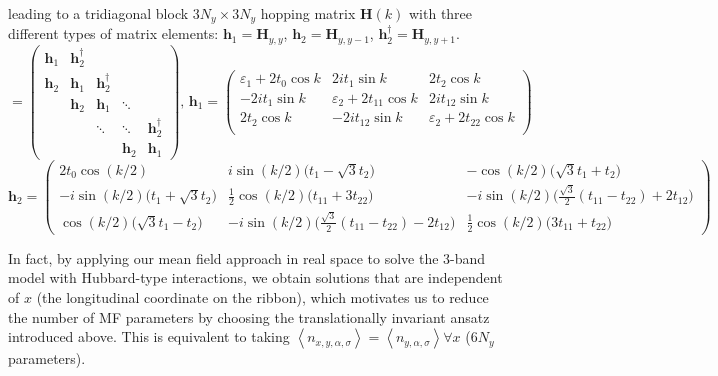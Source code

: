 \begin{strip}
leading to a tridiagonal block $3 N_y \times 3 N_y$ hopping matrix $\bm H (k)$ with three different types of matrix elements: $\bm h_1 = \bm H_{y,y}$, $\bm h_2 = \bm H_{y,y-1}$, $\bm h_2^\dagger = \bm H_{y, y+1}$.
\begin{equation}
[ H_{(\alpha y) (\beta y')} (k) ] = 
\begin{pmatrix}
\bm h_1 & \bm h_2^\dagger & & & \\
\bm h_2 & \bm h_1 & \bm h_2^\dagger & & \\
& \bm h_2 & \bm h_1 & \ddots & \\
& & \ddots & \ddots & \bm h_2^\dagger \\
& & & \bm h_2 & \bm h_1
\end{pmatrix}, \, 
\bm h_1 = 
\begin{pmatrix}
\varepsilon_1 + 2 t_0 \cos k & 2 i t_1 \sin k & 2 t_2 \cos k \\
-2 i t_1 \sin k & \varepsilon_2 + 2 t_{11} \cos k & 2 i t_{12} \sin k \\
2 t_2 \cos k& -2 i t_{12} \sin k & \varepsilon_2 + 2 t_{22} \cos k \\
\end{pmatrix}
\end{equation}
\begin{equation*}
\bm h_2 =
\begin{pmatrix}
2 t_0 \cos ( k / 2 ) & i \sin ( k / 2 ) \bigg( t_1 - \sqrt{3} t_2 \bigg) & - \cos (k /2 ) \bigg( \sqrt{3} t_1 + t_2 \bigg) \\
-i \sin ( k / 2 ) \bigg(t_1 + \sqrt{3} t_2 \bigg) & \frac{1}{2} \cos (k / 2) \bigg( t_{11} + 3 t_{22} \bigg) & -i \sin (k / 2) \bigg( \frac{\sqrt{3}}{2} (t_{11} -  t_{22} ) + 2 t_{12} \bigg) \\
\cos ( k / 2) \bigg( \sqrt{3} t_1 - t_2 \bigg) & -i \sin (k / 2) \bigg( \frac{\sqrt{3}}{2} ( t_{11} - t_{22} ) - 2 t_{12} \bigg) & \frac{1}{2} \cos (k / 2) \bigg( 3 t_{11	} + t_{22} \bigg)
\end{pmatrix}
\end{equation*}
\end{strip}
In fact, by applying our mean field approach in real space to solve the 3-band model with Hubbard-type interactions, we obtain solutions that are independent of $x$ (the longitudinal coordinate on the ribbon), which motivates us to reduce the number of MF parameters by choosing the translationally invariant ansatz introduced above.
This is equivalent to taking $\left\langle n_{x, y,\alpha, \sigma}\right\rangle = \left\langle n_{y,\alpha, \sigma}\right\rangle  \forall x$ ($6 N_y$ parameters).
